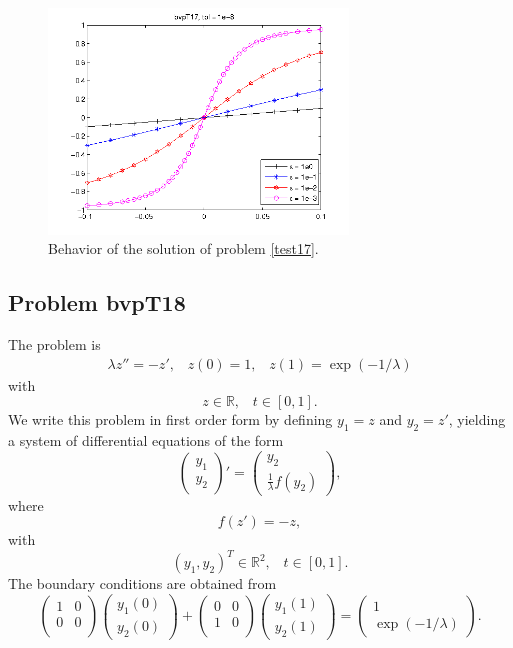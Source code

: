 \documentclass[<options>]{article}
\def \RR {{\mathbb{R}}}
\begin{document}
\begin{figure}[htb]
\centerline{\includegraphics[height=6cm]{Prob17}}
\caption{Behavior of the solution of problem \ref{test17}.}
\end{figure}
\newpage
\subsection{Problem bvpT18}\label{test18}
The problem is 
\begin{eqnarray*}
\lambda z'' =  - z', \;\;\;z(0) = 1, \;\;\; z(1) = \exp(-1 /\lambda)
\end{eqnarray*}
with
\[
z \in \RR, \;\;\; t\in [0,1].
\]
We write this problem in first order form by defining $y_1=z$ and $y_2=z'$, yielding a system of differential equations of the form
\begin{equation*}
\left(\begin{array}{c}
y_1\\
y_2
\end{array}\right)'=
\left(\begin{array}{c}
y_2\\
\frac{1}{\lambda}f(y_2)
\end{array}\right),
\end{equation*}
where
\begin{equation*}
 f(z') = - z,
\end{equation*}
with
\[
(y_1,y_2)^T \in \RR^{2}, \;\;\;  t \in [0,1].
\]
The  boundary conditions are obtained from
\begin{equation*}
\left(
  \begin{array}{cc}
    1 & 0 \\
    0 & 0 \\
  \end{array}
\right)
\left(\begin{array}{c}
y_{1}(0)\\
y_{2}(0)
\end{array}\right)
+
\left(
  \begin{array}{cc}
    0 & 0 \\
    1 & 0 \\
  \end{array}
\right)
\left(\begin{array}{c}
y_{1}(1)\\
y_{2}(1)
\end{array}\right)=\left(\begin{array}{c}
1\\
\exp(-1 /\lambda)
\end{array}\right).
\end{equation*}
\end{document}

